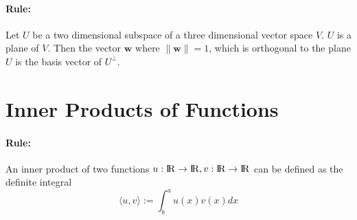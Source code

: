 \documentclass[12pt]{article}
\newcommand{\R}{{\rm I\!R}}
\newcommand{\0}[0]{\bm{0}}
\newcommand{\ipr}[1]{\langle #1 \rangle}
\newcommand{\norm}[1]{\lVert#1\rVert}
\newcommand{\xrule}[1]{\paragraph{\colorbox{#1!30}{\textbf{Rule:}}}}
\begin{document}
\xrule{red} Let $U$ be a two dimensional subspace of a three dimensional vector space $V$. $U$ is a plane of $V$. Then the vector $\bm{w}$ where $\norm{\bm{w}} = 1$, which is orthogonal to the plane $U$ is the basis vector of $U^{\perp}$.

\section{Inner Products of Functions}

\xrule{red} An inner product of two functions $u : \R \rightarrow \R, v : \R \rightarrow \R$ can be defined as the definite integral
%
\begin{equation}
	\ipr{u, v} := \int_b^a u(x) v(x) dx
\end{equation}
\end{document}
